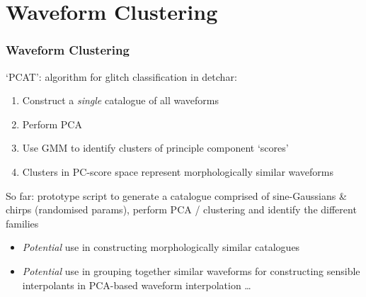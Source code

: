 \documentclass{beamer}
\begin{document}
\section{Waveform Clustering}

\begin{frame}
    \frametitle{Waveform Clustering}
    `PCAT': algorithm for glitch classification in detchar:
    \begin{enumerate}
        \item Construct a \emph{single} catalogue of all waveforms
        \item Perform PCA
        \item Use GMM to identify clusters of principle component
            `scores'
        \item Clusters in PC-score space represent morphologically
            similar waveforms
    \end{enumerate}
    So far: prototype script to generate a catalogue
        comprised of sine-Gaussians \& chirps (randomised params),
        perform PCA / clustering and identify the different families
    \begin{itemize}
        \item \emph{Potential} use in constructing morphologically similar
            catalogues
        \item \emph{Potential} use in grouping together similar waveforms for
            constructing sensible interpolants in PCA-based waveform
            interpolation \dots
    \end{itemize}
\end{frame}
\end{document}
